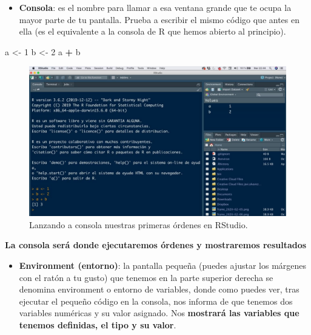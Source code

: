\documentclass[11pt,]{book}
\newenvironment{Shaded}{\begin{snugshade}}{\end{snugshade}}
\newcommand{\DecValTok}[1]{\textcolor[rgb]{0.06,0.06,0.06}{#1}}
\newcommand{\NormalTok}[1]{#1}
\newcommand{\OperatorTok}[1]{\textcolor[rgb]{0.43,0.43,0.43}{\textbf{#1}}}
\newcommand{\StringTok}[1]{\textcolor[rgb]{0.5,0.5,0.5}{#1}}
\providecommand{\tightlist}{%
  \setlength{\itemsep}{0pt}\setlength{\parskip}{0pt}}
\begin{document}
\begin{itemize}
\tightlist
\item
  \textbf{Consola}: es el nombre para llamar a esa ventana grande que te ocupa la mayor parte de tu pantalla. Prueba a escribir el mismo código que antes en ella (es el equivalente a la consola de R que hemos abierto al principio).
\end{itemize}

\begin{Shaded}
\begin{Highlighting}[]
\NormalTok{a <-}\StringTok{ }\DecValTok{1}
\NormalTok{b <-}\StringTok{ }\DecValTok{2}
\NormalTok{a }\OperatorTok{+}\StringTok{ }\NormalTok{b}
\end{Highlighting}
\end{Shaded}

\begin{figure}

{\centering \includegraphics[width=0.75\linewidth]{./img/inicio_rstudio_2} 

}

\caption{Lanzando a consola nuestras primeras órdenes en RStudio.}\label{fig:inicio-rstudio-2}
\end{figure}

\textbf{La consola será donde ejecutaremos órdenes y mostraremos resultados}

\begin{itemize}
\tightlist
\item
  \textbf{Environment (entorno)}: la pantalla pequeña (puedes ajustar los márgenes con el ratón a tu gusto) que tenemos en la parte superior derecha se denomina environment o entorno de variables, donde como puedes ver, tras ejecutar el pequeño código en la consola, nos informa de que tenemos dos variables numéricas y su valor asignado. Nos \textbf{mostrará las variables que tenemos definidas, el tipo y su valor}.
\end{itemize}
\end{document}
